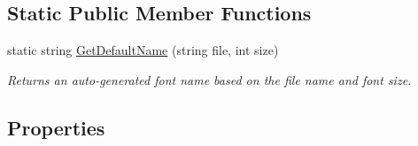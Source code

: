 \subsection*{Static Public Member Functions}
\begin{DoxyCompactItemize}
\item 
static string \hyperlink{class_tri_devs_1_1_tri_engine_1_1_text_1_1_font_a01cad6fae1f74d510554d2fb800ceddf}{Get\-Default\-Name} (string file, int size)
\begin{DoxyCompactList}\small\item\em Returns an auto-\/generated font name based on the file name and font size. \end{DoxyCompactList}\end{DoxyCompactItemize}
\subsection*{Properties}
